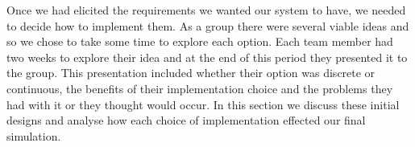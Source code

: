\documentclass{article}
\begin{document}
	Once we had elicited the requirements we wanted our system to have, we needed to decide how to implement them. As a group there were several viable ideas and so we chose to take some time to explore each option. Each team member had two weeks to explore their idea and at the end of this period they presented it to the group. This presentation included whether their option was discrete or continuous, the benefits of their implementation choice and the problems they had with it or they thought would occur. In this section we discuss these initial designs and analyse how each choice of implementation effected our final simulation. 
%		
%				
%
	
\end{document}
